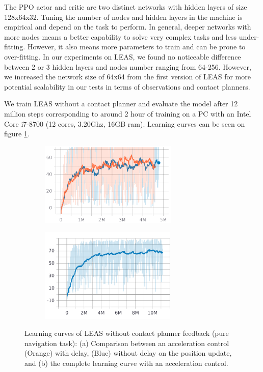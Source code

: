 The PPO actor and critic are two distinct networks with hidden layers of size 128x64x32. Tuning the number of nodes and hidden layers in the machine is empirical and depend on the task to perform. In general, deeper networks with more nodes means a better capability to solve very complex tasks and less under-fitting. However, it also means more parameters to train and can be prone to over-fitting. In our experiments on LEAS, we found no noticeable difference between 2 or 3 hidden layers and nodes number ranging from 64-256. However, we increased the network size of 64x64 from the first version of LEAS \cite{LEAS} for more potential scalability in our tests in terms of observations and contact planners.

We train LEAS without a contact planner and evaluate the model after 12 million steps corresponding to around 2 hour of training on a PC with an Intel Core i7-8700 (12 cores, 3.20Ghz, 16GB ram). Learning curves can be seen on figure \ref{fig:control_LEAS_learning_curves}.

\begin{figure}[ht]
    \centering
    \begin{subfigure}[t]{0.49\linewidth}
    \includegraphics[width=\textwidth, height=4cm]{Figures/Chapter_LEAS/learning_curves_P1.png}
    \caption{}
    \end{subfigure}
    \begin{subfigure}[t]{0.49\linewidth}
    \includegraphics[width=\textwidth, height=4.5cm, trim={0cm 0.2cm 0cm 0cm},clip]{Figures/Chapter_LEAS/learning_curve_leas_p1.png}
    \caption{}
    \end{subfigure}
    \caption{Learning curves of LEAS without contact planner feedback (pure navigation task): (a) Comparison between an acceleration control (Orange) with delay, (Blue) without delay on the position update, and (b) the complete learning curve with an acceleration control.}
    \label{fig:control_LEAS_learning_curves}
\end{figure}


